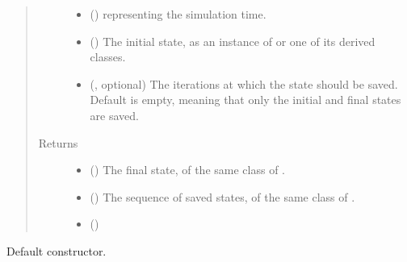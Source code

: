 \documentclass[letterpaper,10pt,english]{sphinxmanual}
\begin{document}
\begin{fulllineitems}
\begin{fulllineitems}
\begin{quote}
\begin{description}
\begin{itemize}
\item {} 
 () \textendash{}  representing the simulation time.

\item {} 
 () \textendash{} The initial state, as an instance of {\hyperref[\detokenize{api:storages.grid_data.GridData}]{}} or one of its derived classes.

\item {} 
 (, optional) \textendash{} The iterations at which the state should be saved. Default is empty, meaning that only the initial and
final states are saved.

\end{itemize}

\item[{Returns}] \leavevmode
\begin{itemize}
\item {} 
 () \textendash{} The final state, of the same class of .

\item {} 
 () \textendash{} The sequence of saved states, of the same class of .

\item {} 
 ()

\end{itemize}


\end{description}\end{quote}

\end{fulllineitems}


\begin{fulllineitems}
\label{\detokenize{api:model.Model.__init__}}
Default constructor.

\end{fulllineitems}



\end{fulllineitems}
\end{document}
